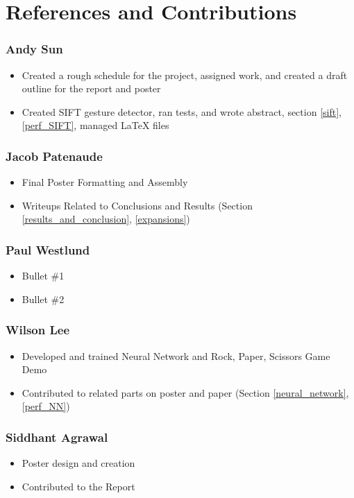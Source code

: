 \section{References and Contributions}

\subsubsection*{Andy Sun}
\begin{itemize}
\item Created a rough schedule for the project, assigned work, and created a draft outline for the report and poster
\item Created SIFT gesture detector, ran tests, and wrote abstract, section \ref{sift}, \ref{perf_SIFT}, managed \LaTeX{} files
\end{itemize}

\subsubsection*{Jacob Patenaude}
\begin{itemize}
\item Final Poster Formatting and Assembly
\item Writeups Related to Conclusions and Results (Section \ref{results_and_conclusion}, \ref{expansions})
\end{itemize}

\subsubsection*{Paul Westlund}
\begin{itemize}
\item Bullet \#1
\item Bullet \#2
\end{itemize}

\subsubsection*{Wilson Lee}
\begin{itemize}
\item Developed and trained Neural Network and Rock, Paper, Scissors Game Demo
\item Contributed to related parts on poster and paper (Section \ref{neural_network}, \ref{perf_NN})
\end{itemize}

\subsubsection*{Siddhant Agrawal}
\begin{itemize}
\item Poster design and creation
\item Contributed to the Report
\end{itemize}
